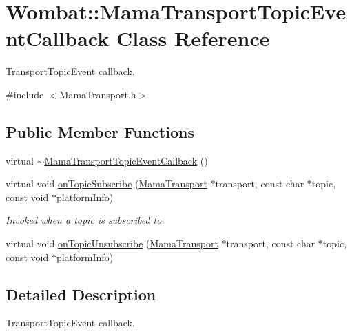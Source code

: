 \hypertarget{classWombat_1_1MamaTransportTopicEventCallback}{
\section{Wombat::MamaTransportTopicEventCallback Class Reference}
\label{classWombat_1_1MamaTransportTopicEventCallback}
}


TransportTopicEvent callback.  


{\ttfamily \#include $<$MamaTransport.h$>$}\subsection*{Public Member Functions}
\begin{DoxyCompactItemize}
\item 
virtual \hyperlink{classWombat_1_1MamaTransportTopicEventCallback_ae2e4aabdbcdeacafb140ebcd340e8a5c}{$\sim$MamaTransportTopicEventCallback} ()
\item 
virtual void \hyperlink{classWombat_1_1MamaTransportTopicEventCallback_af42c672711aee8ee037dc54355253b8a}{onTopicSubscribe} (\hyperlink{classWombat_1_1MamaTransport}{MamaTransport} $\ast$transport, const char $\ast$topic, const void $\ast$platformInfo)
\begin{DoxyCompactList}\small\item\em Invoked when a topic is subscribed to. \item\end{DoxyCompactList}\item 
virtual void \hyperlink{classWombat_1_1MamaTransportTopicEventCallback_af6cca0f35e9380019e4c780dbd7d8a2b}{onTopicUnsubscribe} (\hyperlink{classWombat_1_1MamaTransport}{MamaTransport} $\ast$transport, const char $\ast$topic, const void $\ast$platformInfo)
\end{DoxyCompactItemize}


\subsection{Detailed Description}
TransportTopicEvent callback. 

